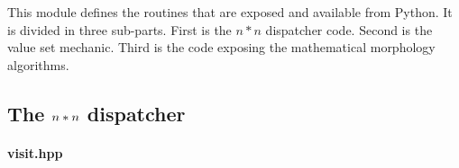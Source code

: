 This module defines the routines that are exposed and available from Python. It is divided in three sub-parts. First is
the $n*n$ dispatcher code. Second is the value set mechanic. Third is the code exposing the mathematical morphology
algorithms.

\subsection{The $\protect n*n$ dispatcher}
\label{appendix:static-dynamic-bridge.mm.nndispatcher}

\paragraph{visit.hpp}
\label{appendix:static-dynamic-bridge.mm.nndispatcher.visit.hpp}

